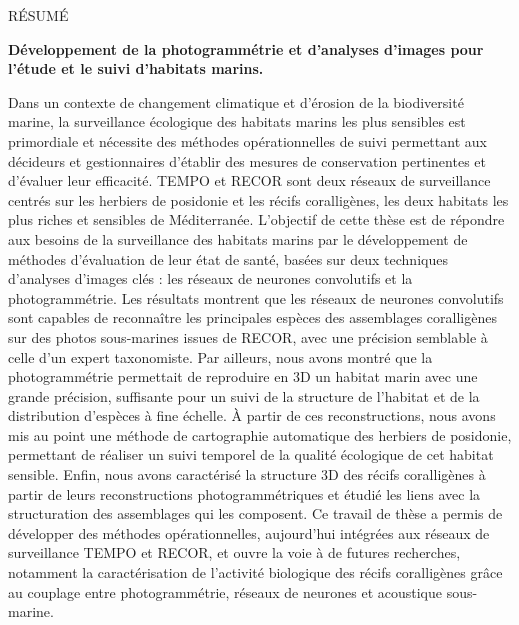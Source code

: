 \small
{}
{\centerline {{\sffamily \Large RÉSUMÉ}}}

\noindent\textbf{Développement de la photogrammétrie et d’analyses d’images pour l’étude et le suivi d’habitats marins.}

\noindent Dans un contexte de changement climatique et d’érosion de la biodiversité marine, la surveillance écologique des habitats marins les plus sensibles est primordiale et nécessite des méthodes opérationnelles de suivi permettant aux décideurs et gestionnaires d’établir des mesures de conservation pertinentes et d’évaluer leur efficacité. TEMPO et RECOR sont deux réseaux de surveillance centrés sur les herbiers de posidonie et les récifs coralligènes, les deux habitats les plus riches et sensibles de Méditerranée. L’objectif de cette thèse est de répondre aux besoins de la surveillance des habitats marins par le développement de méthodes d’évaluation de leur état de santé, basées sur deux techniques d’analyses d’images clés : les réseaux de neurones convolutifs et la photogrammétrie. Les résultats montrent que les réseaux de neurones convolutifs sont capables de reconnaître les principales espèces des assemblages coralligènes sur des photos sous-marines issues de RECOR, avec une précision semblable à celle d’un expert taxonomiste. Par ailleurs, nous avons montré que la photogrammétrie permettait de reproduire en 3D un habitat marin avec une grande précision, suffisante pour un suivi de la structure de l’habitat et de la distribution d’espèces à fine échelle. À partir de ces reconstructions, nous avons mis au point une méthode de cartographie automatique des herbiers de posidonie, permettant de réaliser un suivi temporel de la qualité écologique de cet habitat sensible. Enfin, nous avons caractérisé la structure 3D des récifs coralligènes à partir de leurs reconstructions photogrammétriques et étudié les liens avec la structuration des assemblages qui les composent. Ce travail de thèse a permis de développer des méthodes opérationnelles, aujourd’hui intégrées aux réseaux de surveillance TEMPO et RECOR, et ouvre la voie à de futures recherches, notamment la caractérisation de l’activité biologique des récifs coralligènes grâce au couplage entre photogrammétrie, réseaux de neurones et acoustique sous-marine.

